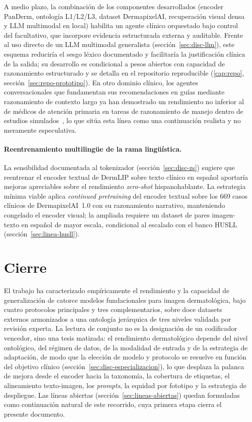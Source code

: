 A medio plazo, la combinación de los componentes desarrollados (encoder
PanDerm, ontología L1/L2/L3, dataset DermapixelAI, recuperación visual
densa y LLM multimodal en local) habilita un agente clínico orquestado
bajo control del facultativo, que incorpore evidencia estructurada externa
y auditable. Frente al uso directo de un LLM multimodal generalista
(sección~\ref{sec:disc-llm}), este esquema reduciría el sesgo léxico
documentado y facilitaría la justificación clínica de la salida; su
desarrollo es condicional a pesos abiertos con capacidad de razonamiento
estructurado y se detalla en el repositorio reproducible (\ref{cap:repo}, sección~\ref{sec:repo-prototipo}). En otro dominio clínico, los agentes
conversacionales que fundamentan sus recomendaciones en guías mediante
razonamiento de contexto largo ya han demostrado un rendimiento no inferior
al de médicos de atención primaria en tareas de razonamiento de manejo
dentro de estudios simulados~\cite{amie2026}, lo que sitúa esta línea como
una continuación realista y no meramente especulativa.

\paragraph{Reentrenamiento multilingüe de la rama lingüística.}
\label{sec:linea-multilingual}
La sensibilidad documentada al tokenizador (sección~\ref{sec:disc-zs})
sugiere que reentrenar el encoder textual de DermLIP sobre texto clínico
en español aportaría mejoras apreciables sobre el rendimiento
\emph{zero-shot} hispanohablante. La estrategia mínima viable aplica
\emph{continued pretraining} del encoder textual sobre los $669$ casos
clínicos de DermapixelAI~1.0 con su razonamiento narrativo, manteniendo
congelado el encoder visual; la ampliada requiere un dataset de pares
imagen-texto en español de mayor escala, condicional al escalado con el
banco HUSLL (sección~\ref{sec:linea-husll}).

\section{Cierre}
\label{sec:cierre}

El trabajo ha caracterizado empíricamente el rendimiento y la
capacidad de generalización de catorce modelos fundacionales para
imagen dermatológica, bajo cuatro protocolos principales y tres
complementarios, sobre doce datasets externos armonizados a una
ontología jerárquica de tres niveles validada por revisión experta. La
lectura de conjunto no es la designación de un codificador vencedor,
sino una tesis matizada: el rendimiento dermatológico depende del nivel
ontológico, del régimen de datos, de la modalidad de entrada y de la
estrategia de adaptación, de modo que la elección de modelo y protocolo
se resuelve en función del objetivo clínico
(sección~\ref{sec:disc-especializacion}), lo que desplaza la palanca de
mejora desde el encoder hacia la taxonomía, la cobertura de etiquetas, el
alineamiento texto-imagen, los \emph{prompts}, la equidad por fototipo y
la estrategia de despliegue. Las líneas abiertas
(sección~\ref{sec:lineas-abiertas}) quedan formuladas como continuación
natural de este recorrido, cuya primera etapa cierra el presente
documento.

